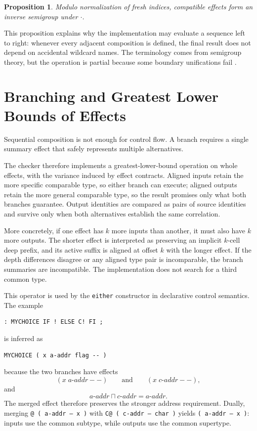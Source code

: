 \documentclass[11pt]{article}
\newtheorem{proposition}{Proposition}
\newcommand{\glb}{\mathbin{\sqcap}}
\newcommand{\compose}{\mathbin{\cdot}}
\begin{document}
\begin{proposition}
Modulo normalization of fresh indices, compatible effects form an inverse semigroup under $\compose$.
\end{proposition}

\noindent
This proposition explains why the implementation may evaluate a sequence left to right: whenever every adjacent composition is defined, the final result does not depend on accidental wildcard names. The terminology comes from semigroup theory, but the operation is partial because some boundary unifications fail \cite{howie1995semigroup}.

\section{Branching and Greatest Lower Bounds of Effects}
Sequential composition is not enough for control flow. A branch requires a single summary effect that safely represents multiple alternatives.

The checker therefore implements a greatest-lower-bound operation on whole effects, with the variance induced by effect contracts. Aligned inputs retain the more specific comparable type, so either branch can execute; aligned outputs retain the more general comparable type, so the result promises only what both branches guarantee. Output identities are compared as pairs of source identities and survive only when both alternatives establish the same correlation.

More concretely, if one effect has $k$ more inputs than another, it must also have $k$ more outputs. The shorter effect is interpreted as preserving an implicit $k$-cell deep prefix, and its active suffix is aligned at offset $k$ with the longer effect. If the depth differences disagree or any aligned type pair is incomparable, the branch summaries are incompatible. The implementation does not search for a third common type.

This operator is used by the \texttt{either} constructor in declarative control semantics. The example
\begin{lstlisting}
: MYCHOICE IF ! ELSE C! FI ;
\end{lstlisting}
is inferred as
\begin{lstlisting}
MYCHOICE ( x a-addr flag -- )
\end{lstlisting}
because the two branches have effects
\[
(x\;a\text{-}addr -- )
\qquad\text{and}\qquad
(x\;c\text{-}addr -- ),
\]
and
\[
a\text{-}addr \glb c\text{-}addr = a\text{-}addr.
\]
The merged effect therefore preserves the stronger address requirement. Dually, merging \texttt{@ ( a-addr -- x )} with \texttt{C@ ( c-addr -- char )} yields \texttt{( a-addr -- x )}: inputs use the common subtype, while outputs use the common supertype.
\end{document}
